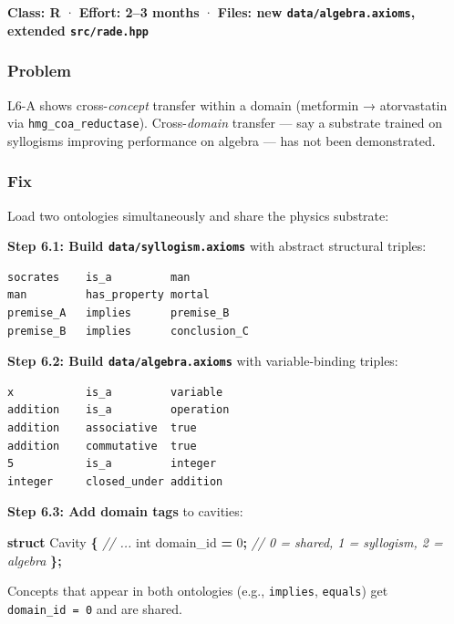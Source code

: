 \documentclass[
  11pt,
  a4paper,
]{article}
\newenvironment{Shaded}{\begin{snugshade}}{\end{snugshade}}
\newcommand{\CommentTok}[1]{\textcolor[rgb]{0.56,0.35,0.01}{\textit{#1}}}
\newcommand{\DataTypeTok}[1]{\textcolor[rgb]{0.13,0.29,0.53}{#1}}
\newcommand{\DecValTok}[1]{\textcolor[rgb]{0.00,0.00,0.81}{#1}}
\newcommand{\KeywordTok}[1]{\textcolor[rgb]{0.13,0.29,0.53}{\textbf{#1}}}
\newcommand{\NormalTok}[1]{#1}
\newcommand{\OperatorTok}[1]{\textcolor[rgb]{0.81,0.36,0.00}{\textbf{#1}}}
\begin{document}
\textbf{Class: R} · \textbf{Effort: 2--3 months} · \textbf{Files: new
\texttt{data/algebra.axioms}, extended \texttt{src/rade.hpp}}

\subsubsection{Problem}\label{problem-5}

L6-A shows cross-\emph{concept} transfer within a domain (metformin →
atorvastatin via \texttt{hmg\_coa\_reductase}). Cross-\emph{domain}
transfer --- say a substrate trained on syllogisms improving performance
on algebra --- has not been demonstrated.

\subsubsection{Fix}\label{fix-5}

Load two ontologies simultaneously and share the physics substrate:

\textbf{Step 6.1: Build \texttt{data/syllogism.axioms}} with abstract
structural triples:

\begin{verbatim}
socrates    is_a         man
man         has_property mortal
premise_A   implies      premise_B
premise_B   implies      conclusion_C
\end{verbatim}

\textbf{Step 6.2: Build \texttt{data/algebra.axioms}} with
variable-binding triples:

\begin{verbatim}
x           is_a         variable
addition    is_a         operation
addition    associative  true
addition    commutative  true
5           is_a         integer
integer     closed_under addition
\end{verbatim}

\textbf{Step 6.3: Add domain tags} to cavities:

\begin{Shaded}
\begin{Highlighting}[]
\KeywordTok{struct}\NormalTok{ Cavity }\OperatorTok{\{}
    \CommentTok{// ...}
    \DataTypeTok{int}\NormalTok{ domain\_id }\OperatorTok{=} \DecValTok{0}\OperatorTok{;}    \CommentTok{// 0 = shared, 1 = syllogism, 2 = algebra}
\OperatorTok{\};}
\end{Highlighting}
\end{Shaded}

Concepts that appear in both ontologies (e.g., \texttt{implies},
\texttt{equals}) get \texttt{domain\_id\ =\ 0} and are shared.
\end{document}
